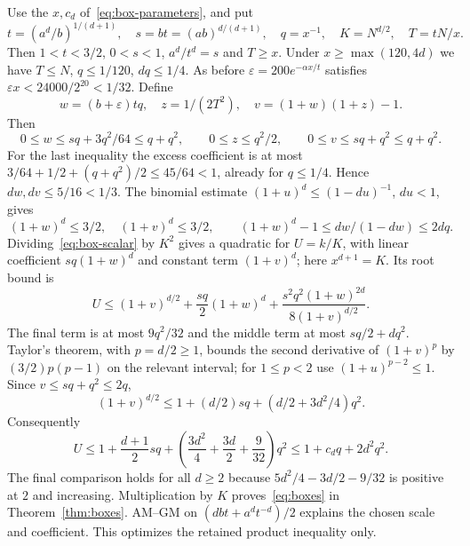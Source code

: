 \documentclass[10pt]{article}
\numberwithin{equation}{section}
\theoremstyle{remark}
\begin{document}
Use the $x,c_d$ of~\eqref{eq:box-parameters}, and put
\[
 t=(a^d/b)^{1/(d+1)},\quad s=bt=(ab)^{d/(d+1)},\quad
 q=x^{-1},\quad K=N^{d/2},\quad T=tN/x.
\]
Then $1<t<3/2$, $0<s<1$, $a^d/t^d=s$ and $T\ge x$.
Under $x\ge\max(120,4d)$ we have $T\le N$, $q\le1/120$, $dq\le1/4$.
As before $\varepsilon=200e^{-\alpha x/t}$ satisfies
$\varepsilon x<24000/2^{20}<1/32$. Define
\[
 w=(b+\varepsilon)tq,\quad z=1/(2T^2),\quad v=(1+w)(1+z)-1.
\]
Then
\[
 0\le w\le sq+3q^2/64\le q+q^2,\qquad
 0\le z\le q^2/2,\qquad 0\le v\le sq+q^2\le q+q^2.
\]
For the last inequality the excess coefficient is at most
$3/64+1/2+(q+q^2)/2\le45/64<1$, already for $q\le1/4$.
Hence $dw,dv\le5/16<1/3$. The binomial estimate
$(1+u)^d\le(1-du)^{-1}$, $du<1$, gives
\[
 (1+w)^d\le3/2,\quad (1+v)^d\le3/2,\qquad
 (1+w)^d-1\le dw/(1-dw)\le2dq.
\]
Dividing~\eqref{eq:box-scalar} by $K^2$ gives a quadratic for
$U=k/K$, with linear coefficient $sq(1+w)^d$ and constant term
$(1+v)^d$; here $x^{d+1}=K$. Its root bound is
\begin{equation}\label{eq:box-root}
 U\le(1+v)^{d/2}+\frac{sq}{2}(1+w)^d
       +\frac{s^2q^2(1+w)^{2d}}{8(1+v)^{d/2}}.
\end{equation}
The final term is at most $9q^2/32$ and the middle term at most
$sq/2+dq^2$. Taylor's theorem, with $p=d/2\ge1$, bounds the
second derivative of $(1+v)^p$ by $(3/2)p(p-1)$ on the relevant
interval; for $1\le p<2$ use $(1+u)^{p-2}\le1$.
Since $v\le sq+q^2\le2q$,
\[
 (1+v)^{d/2}\le1+(d/2)sq+(d/2+3d^2/4)q^2.
\]
Consequently
\[
 U\le1+\frac{d+1}{2}sq+
       \left(\frac{3d^2}{4}+\frac{3d}{2}+\frac9{32}\right)q^2
 \le1+c_dq+2d^2q^2.
\]
The final comparison holds for all $d\ge2$ because
$5d^2/4-3d/2-9/32$ is positive at $2$ and increasing.
Multiplication by $K$ proves~\eqref{eq:boxes} in Theorem~\ref{thm:boxes}.
AM--GM on $(dbt+a^dt^{-d})/2$ explains the chosen scale and
coefficient. This optimizes the retained product inequality only.
\end{document}
